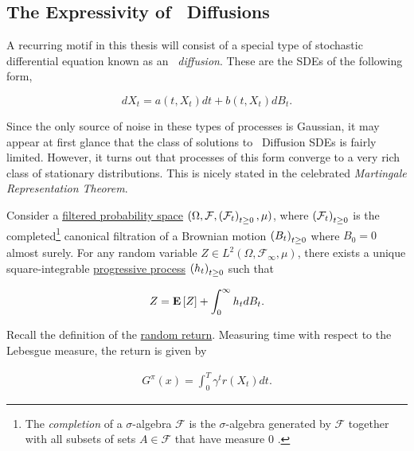\subsection{The Expressivity of \Ito\ Diffusions}\label{s:ito-diffusion}
A recurring motif in this thesis will consist of a special type of
stochastic differential equation known as an \emph{\Ito\
  diffusion}. These are the SDEs of the following form,

\begin{equation}\label{def:ito-diffusion}
  dX_t = a(t, X_t)dt + b(t, X_t)dB_t.
\end{equation}

Since the only source of noise in these types of processes is
Gaussian, it may appear at first glance that the class of solutions to
\Ito\ Diffusion SDEs is fairly limited.
However, it turns out that processes of this form
converge to a very rich class of stationary distributions. This is
nicely stated in the celebrated \emph{Martingale Representation Theorem}.

\begin{theorem}\label{thm:martingale-representation}
  Consider a \hyperref[def:filtration]{filtered probability space}
  $(\Omega, \mathcal{F}, \indexedabove{t}{\mathcal{F}}, \mu)$, where
  $\indexedabove{t}{\mathcal{F}}$ is the completed\footnote{The
    \emph{completion} of a $\sigma$-algebra $\mathcal{F}$ is the
    $\sigma$-algebra generated by $\mathcal{F}$ together with all
    subsets of sets $A\in\mathcal{F}$ that have measure $0$
    \citep{le2016brownian}.} canonical filtration of a Brownian motion
  $\indexedabove{t}{B}$ where $B_0=0$ almost surely. For any random
  variable $Z\in L^2(\Omega, \mathcal{F}_\infty, \mu)$, there exists a
  unique square-integrable \hyperref[def:process:progressive]{progressive
    process} $\indexedabove{t}{h}$ such that

  \begin{equation}
    \label{eq:3}
    Z = \Expect{Z} + \int_0^\infty h_tdB_t.
  \end{equation}
\end{theorem}

Recall the definition of the \hyperref[eq:return:abstract]{random
  return}. Measuring time with respect to the Lebesgue measure, the
return is given by

\begin{align*}
  G^\pi(x) = \int_0^T\gamma^tr(X_t)dt.
\end{align*}

